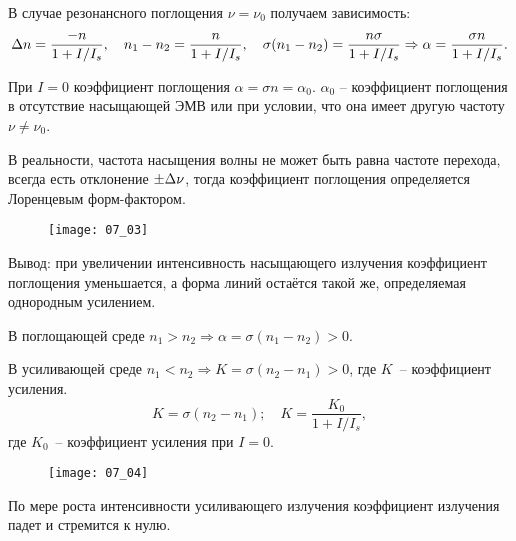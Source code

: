 В случае резонансного поглощения \( \nu = \nu_0 \) получаем зависимость:
\[
  \Delta n = \frac{-n}{1 + I / I_s}, \quad
    n_1 - n_2 = \frac{n}{1 + I / I_s}, \quad
    \sigma(n_1 - n_2) = \frac{n\sigma}{1 + I / I_s} \Rightarrow
    \alpha = \frac{\sigma n}{1 + I / I_s}.
\]

При \( I = 0 \) коэффициент поглощения \( \alpha = \sigma n = \alpha_0 \).
\( \alpha_0 \) -- коэффициент поглощения в отсутствие насыщающей ЭМВ или при
условии, что она имеет другую частоту \( \nu \neq \nu_0 \).

В реальности, частота насыщения волны не может быть равна частоте перехода,
всегда есть отклонение \( \pm\Delta\nu \), тогда коэффициент поглощения
определяется Лоренцевым форм-фактором.
\begin{figure}[h]
    \center
    \texttt{[image: 07\_03]}
\end{figure}

Вывод: при увеличении интенсивность насыщающего излучения коэффициент
поглощения уменьшается, а форма линий остаётся такой же, определяемая
однородным усилением.


В поглощающей среде \( n_1 > n_2 \Rightarrow \alpha = \sigma(n_1 - n_2) > 0 \).

В усиливающей среде \( n_1 < n_2 \Rightarrow K = \sigma(n_2 - n_1) > 0 \),
где \( K \)~-- коэффициент усиления.
\[
    K = \sigma(n_2 - n_1); \quad K = \frac{K_0}{1 + I / I_s},
\]
где \( K_0 \)~-- коэффициент усиления при \( I = 0 \).

\begin{figure}[h]
    \center
    \texttt{[image: 07\_04]}
\end{figure}

По мере роста интенсивности усиливающего излучения коэффициент излучения падет
и стремится к нулю.

